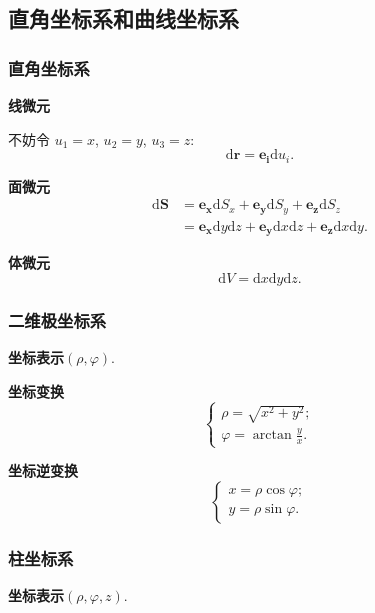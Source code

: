 \subsection{直角坐标系和曲线坐标系}
\subsubsection{直角坐标系}
\textbf{线微元}

不妨令 $u_1=x$, $u_2=y$, $u_3=z$:
\begin{equation}
    \mathrm{d}\bm{r}=\bm{e_i}\mathrm{d}u_i.
\end{equation}

\textbf{面微元}
\begin{align*}
    \mathrm{d}\bm{S} & =\bm{e_x}\mathrm{d}S_x+\bm{e_y}\mathrm{d}S_y+\bm{e_z}\mathrm{d}S_z                             \\
                     & =\bm{e_x}\mathrm{d}y\mathrm{d}z+\bm{e_y}\mathrm{d}x\mathrm{d}z+\bm{e_z}\mathrm{d}x\mathrm{d}y.
\end{align*}

\textbf{体微元}
\begin{equation}
    \mathrm{d}V=\mathrm{d}x\mathrm{d}y\mathrm{d}z.
\end{equation}

\subsubsection{二维极坐标系}
\textbf{坐标表示}\quad $(\rho, \varphi)$.

\textbf{坐标变换}
\begin{equation}
    \begin{cases}
        \rho=\sqrt{x^2+y^2}; \\
        \varphi=\arctan\frac{y}{x}.
    \end{cases}
\end{equation}

\textbf{坐标逆变换}
\begin{equation}
    \begin{cases}
        x=\rho\cos\varphi; \\
        y=\rho\sin\varphi.
    \end{cases}
\end{equation}

\subsubsection{柱坐标系}
\textbf{坐标表示}\quad $(\rho, \varphi, z)$.

